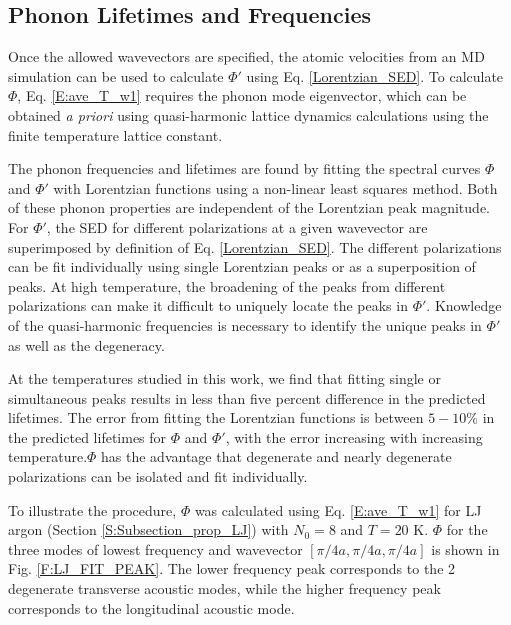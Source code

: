 \documentclass[letterpaper,12pt]{article}
\begin{document}
\subsection{\label{Subsection_Comp_Details_2}Phonon Lifetimes and Frequencies}

Once the allowed wavevectors are specified, the atomic velocities from an MD simulation can be used to calculate $\Phi'$ using Eq$.$ \eqref{Lorentzian_SED}. To calculate $\Phi$, Eq$.$ \eqref{E:ave_T_w1} requires the phonon mode eigenvector, which can be obtained {\em a priori} using quasi-harmonic lattice dynamics calculations using the finite temperature lattice constant.\cite{mcgaughey2006b}

The phonon frequencies and lifetimes are found by fitting the spectral curves $\Phi$ and $\Phi'$ with Lorentzian functions using a non-linear least squares method. Both of these phonon properties are independent of the Lorentzian peak magnitude. For $\Phi'$, the SED for different polarizations at a given wavevector are superimposed by definition of Eq$.$ \eqref{Lorentzian_SED}. The different polarizations can be fit individually using single Lorentzian peaks or as a superposition of peaks. At high temperature, the broadening of the peaks from different polarizations can make it difficult to uniquely locate the peaks in $\Phi'$. Knowledge of the quasi-harmonic frequencies is necessary to identify the unique peaks in $\Phi'$ as well as the degeneracy.\cite{mcgaughey2006b,turney2009a}

At the temperatures studied in this work, we find that fitting single or simultaneous peaks results in less than five percent difference in the predicted lifetimes. The error from fitting the Lorentzian functions is between $5-10\%$ in the predicted lifetimes for $\Phi$ and $\Phi'$, with the error increasing with increasing temperature.\footnotemark  $\Phi$ has the advantage that degenerate and nearly degenerate polarizations can be isolated and fit individually.

To illustrate the procedure, $\Phi$ was calculated using Eq$.$ \eqref{E:ave_T_w1} for LJ argon (Section \ref{S:Subsection_prop_LJ}) with $N_0=8$ and $T=20$ K. $\Phi$ for the three modes of lowest frequency and wavevector $[\pi/4a,\pi/4a,\pi/4a]$ is shown in Fig$.$ \ref{F:LJ_FIT_PEAK}. The lower frequency peak corresponds to the 2 degenerate transverse acoustic modes, while the higher frequency peak corresponds to the longitudinal acoustic mode.\cite{dove1993}
\end{document}

